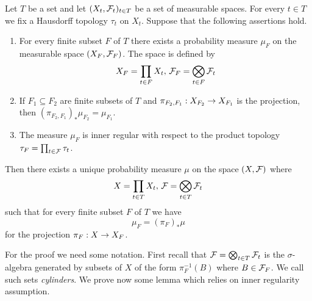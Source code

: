 \begin{theorem}\label{theorem:Daniell_Kolmogorov_extension}
Let $T$ be a set and let $(X_t,{\mathcal F}_t)_{t\in T}$ be a set of measurable spaces. For every $t\in T$ we fix a Hausdorff topology $\tau_t$ on $X_t$. Suppose that the following assertions hold.
\begin{enumerate}[label=\emph{\textbf{(\arabic*)}}, leftmargin=*]
\item For every finite subset $F$ of $T$ there exists a probability measure $\mu_F$ on the measurable space $(X_F,{\mathcal F}_F)$. The space is defined by
$$X_F = \prod_{t\in F}X_t,\,{\mathcal F}_F = \bigotimes_{t\in F}{\mathcal F}_t$$
\item If $F_1\subseteq F_2$ are finite subsets of $T$ and $\pi_{F_2,F_1}:X_{F_2}\rightarrow X_{F_1}$ is the projection, then $\left(\pi_{F_2,F_1}\right)_*\mu_{F_2} = \mu_{F_1}$.
\item The measure $\mu_F$ is inner regular with respect to the product topology $\tau_F = \prod_{t\in {\mathcal F}}\tau_t$.
\end{enumerate}
Then there exists a unique probability measure $\mu$ on the space $(X,{\mathcal F})$ where 
$$X = \prod_{t\in T}X_t,\,{\mathcal F} = \bigotimes_{t\in T}{\mathcal F}_t$$
such that for every finite subset $F$ of $T$ we have
$$\mu_F = \left(\pi_F\right)_*\mu$$
for the projection $\pi_F:X\rightarrow X_F$.
\end{theorem}
\noindent
For the proof we need some notation. First recall that ${\mathcal F} = \bigotimes_{t\in T}{\mathcal F}_t$ is the $\sigma$-algebra generated by subsets of $X$ of the form $\pi_F^{-1}(B)$ where $B\in {\mathcal F}_F$. We call such sets \textit{cylinders}. We prove now some lemma which relies on inner regularity assumption.

